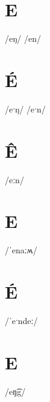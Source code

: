 \documentclass[10pt,a4paper,twoside]{book}
\begin{document}
\section*{E}

\begin{multicols}{3}
 {/eŋ/} {}
 {/en/} {}
\end{multicols}

\section*{É}

\begin{multicols}{3}
 {/eˑŋ/} {}
 {/eˑn/} {}
\end{multicols}

\section*{Ê}

\begin{multicols}{3}
 {/eːn/} {}
\end{multicols}

\section*{E}

\begin{multicols}{3}
 {/ˈenaːʍ/} {}
\end{multicols}

\section*{É}

\begin{multicols}{3}
 {/ˈeˑndeː/} {}
\end{multicols}

\section*{E}

\begin{multicols}{3}
 {/eŋ͡g/} {}
\end{multicols}
\end{document}
